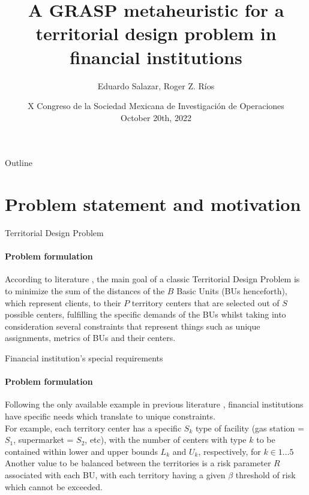 \documentclass{beamer}
\title[A GRASP metaheuristic for a TDP]
{A GRASP metaheuristic for a territorial design problem in financial institutions}
\author{Eduardo Salazar, Roger Z. Ríos}
\institute[]{
    Department of Mechanical and Electrical Engineering \\
    Universidad Autónoma de Nuevo León \\
    San Nicolás de los Garza, N.L.
}
\date[X CSMIO]{
    X Congreso de la Sociedad Mexicana de Investigación de Operaciones \\ 
    October 20th, 2022
}
\begin{document}
\begin{frame}
    \titlepage
\end{frame}

\begin{frame}{Outline}
    \tableofcontents
\end{frame}

\section{Problem statement and motivation}

\begin{frame}{Territorial Design Problem}
    \framesubtitle{Problem formulation}
    According to literature \cite{cor2009}, the main goal of a classic Territorial Design Problem is to minimize the sum of the distances of the $B$ Basic Units (BUs henceforth), which represent clients, to their $P$ territory centers that are selected out of $S$ possible  centers, fulfilling the specific demands of the BUs whilst taking into consideration several constraints that represent things such as unique assignments, metrics of BUs and their centers.
\end{frame}

\begin{frame}{Financial institution's special requirements}
    \framesubtitle{Problem formulation}
    Following the only available example in previous literature \cite{jimo2020}, financial institutions have specific needs which translate to unique constraints. \\
    For example, each territory center has a specific $S_k$ type of facility (gas station = $S_1$, supermarket = $S_2$, etc), with the number of centers with type $k$ to be contained within lower and upper bounds $L_k$ and $U_k$, respectively, for $k \in 1\ldots5$ \\
    Another value to be balanced between the territories is a risk parameter $R$ associated with each BU, with each territory having a given $\beta$ threshold of risk which cannot be exceeded.
\end{frame}
\end{document}

